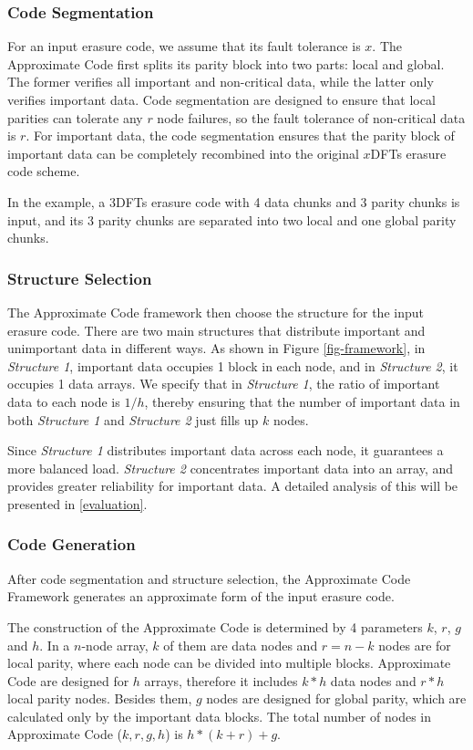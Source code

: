 \documentclass[sigconf]{acmart}
\begin{document}
\subsubsection{Code Segmentation}
For an input erasure code, we assume that its fault tolerance is $x$. The Approximate Code first splits its parity block into two parts: local and global. The former verifies all important and non-critical data, while the latter only verifies important data. Code segmentation are designed to ensure that local parities can tolerate any $r$ node failures, so the fault tolerance of non-critical data is $r$. For important data, the code segmentation ensures that the parity block of important data can be completely recombined into the original $x$DFTs erasure code scheme. 

In the example, a 3DFTs erasure code with 4 data chunks and 3 parity chunks is input, and its 3 parity chunks are separated into two local and one global parity chunks.

\subsubsection{Structure Selection}
The Approximate Code framework then choose the structure for the input erasure code.
There are two main structures that distribute important and unimportant data in different ways.
As shown in Figure \ref{fig-framework}, in \emph{Structure 1}, important data occupies 1 block in each node, and in \emph{Structure 2}, it occupies 1 data arrays.
We specify that in \emph{Structure 1}, the ratio of important data to each node is $1/h$, thereby ensuring that the number of important data in both \emph{Structure 1} and \emph{Structure 2} just fills up $k$ nodes.

Since \emph{Structure 1} distributes important data across each node, it guarantees a more balanced load. \emph{Structure 2} concentrates important data into an array, and provides greater reliability for important data. A detailed analysis of this will be presented in \ref{evaluation}.

\subsubsection{Code Generation}
After code segmentation and structure selection, the Approximate Code Framework generates an approximate form of the input erasure code.

The construction of the Approximate Code is determined by 4 parameters $k$, $r$, $g$ and $h$. 
In a $n$-node array, $k$ of them are data nodes and $r=n-k$ nodes are for local parity, where each node can be divided into multiple blocks.
Approximate Code are designed for $h$ arrays, therefore it includes $k*h$ data nodes and $r*h$ local parity nodes.
Besides them, $g$ nodes are designed for global parity, which are calculated only by the important data blocks. The total number of nodes in Approximate Code ($k,r,g,h$) is 
$h*(k+r) + g$.
\end{document}

